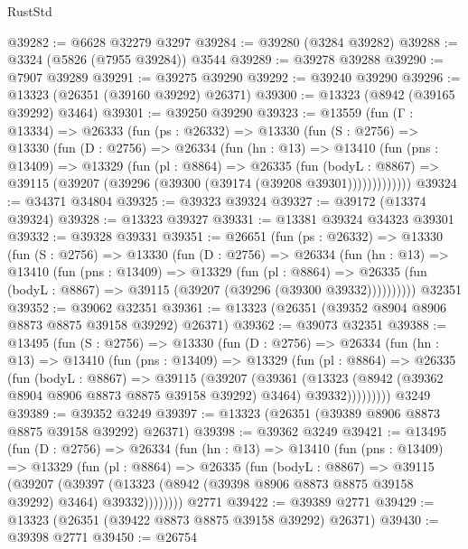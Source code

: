 \begin{lexlean}{RustStd}
\begin{coremodule}
@39282 := @6628 @32279 @3297
@39284 := @39280 (@3284 @39282)
@39288 := @3324 (@5826 (@7955 @39284)) @3544
@39289 := @39278 @39288
@39290 := @7907 @39289
@39291 := @39275 @39290
@39292 := @39240 @39290
@39296 := @13323 (@26351 (@39160 @39292) @26371)
@39300 := @13323 (@8942 (@39165 @39292) @3464)
@39301 := @39250 @39290
@39323 := @13559
    (fun (Γ : @13334) =>
    @26333
      (fun (ps : @26332) =>
      @13330
        (fun (S : @2756) =>
        @13330
          (fun (D : @2756) =>
          @26334
            (fun (hn : @13) =>
            @13410
              (fun (pns : @13409) =>
              @13329
                (fun (pl : @8864) =>
                @26335
                  (fun (bodyL : @8867) =>
                  @39115 (@39207 (@39296 (@39300 (@39174 (@39208 @39301)))))))))))))
@39324 := @34371 @34804
@39325 := @39323 @39324
@39327 := @39172 (@13374 @39324)
@39328 := @13323 @39327
@39331 := @13381 @39324 @34323 @39301
@39332 := @39328 @39331
@39351 := @26651
    (fun (ps : @26332) =>
    @13330
      (fun (S : @2756) =>
      @13330
        (fun (D : @2756) =>
        @26334
          (fun (hn : @13) =>
          @13410
            (fun (pns : @13409) =>
            @13329
              (fun (pl : @8864) =>
              @26335 (fun (bodyL : @8867) => @39115 (@39207 (@39296 (@39300 @39332))))))))))
    @32351
@39352 := @39062 @32351
@39361 := @13323 (@26351 (@39352 @8904 @8906 @8873 @8875 @39158 @39292) @26371)
@39362 := @39073 @32351
@39388 := @13495
    (fun (S : @2756) =>
    @13330
      (fun (D : @2756) =>
      @26334
        (fun (hn : @13) =>
        @13410
          (fun (pns : @13409) =>
          @13329
            (fun (pl : @8864) =>
            @26335
              (fun (bodyL : @8867) =>
              @39115
                (@39207
                  (@39361
                    (@13323
                      (@8942 (@39362 @8904 @8906 @8873 @8875 @39158 @39292) @3464)
                      @39332)))))))))
    @3249
@39389 := @39352 @3249
@39397 := @13323 (@26351 (@39389 @8906 @8873 @8875 @39158 @39292) @26371)
@39398 := @39362 @3249
@39421 := @13495
    (fun (D : @2756) =>
    @26334
      (fun (hn : @13) =>
      @13410
        (fun (pns : @13409) =>
        @13329
          (fun (pl : @8864) =>
          @26335
            (fun (bodyL : @8867) =>
            @39115
              (@39207
                (@39397
                  (@13323 (@8942 (@39398 @8906 @8873 @8875 @39158 @39292) @3464) @39332))))))))
    @2771
@39422 := @39389 @2771
@39429 := @13323 (@26351 (@39422 @8873 @8875 @39158 @39292) @26371)
@39430 := @39398 @2771
@39450 := @26754

\end{coremodule}
\end{lexlean}
